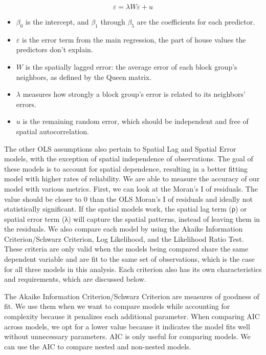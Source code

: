 \documentclass[
  12pt,
]{article}
\providecommand{\tightlist}{%
  \setlength{\itemsep}{0pt}\setlength{\parskip}{0pt}}
\begin{document}
\[ \varepsilon = \lambda W \varepsilon + u \]

\begin{itemize}
\tightlist
\item
  \(\beta_0\) is the intercept, and \(\beta_1\) through \(\beta_5\) are
  the coefficients for each predictor.
\item
  \(\varepsilon\) is the error term from the main regression, the part
  of house values the predictors don't explain.
\item
  \(W\) is the spatially lagged error: the average error of each block
  group's neighbors, as defined by the Queen matrix.
\item
  \(\lambda\) measures how strongly a block group's error is related to
  its neighbors' errors.
\item
  \(u\) is the remaining random error, which should be independent and
  free of spatial autocorrelation.
\end{itemize}

The other OLS assumptions also pertain to Spatial Lag and Spatial Error
models, with the exception of spatial independence of observations. The
goal of these models is to account for spatial dependence, resulting in
a better fitting model with higher rates of reliability. We are able to
measure the accuracy of our model with various metrics. First, we can
look at the Moran's I of residuals. The value should be closer to 0 than
the OLS Moran's I of residuals and ideally not statistically
significant. If the spatial models work, the spatial lag term (ρ) or
spatial error term (λ) will capture the spatial patterns, instead of
leaving them in the residuals. We also compare each model by using the
Akaike Information Criterion/Schwarz Criterion, Log Likelihood, and the
Likelihood Ratio Test. These criteria are only valid when the models
being compared share the same dependent variable and are fit to the same
set of observations, which is the case for all three models in this
analysis. Each criterion also has its own characteristics and
requirements, which are discussed below.

The Akaike Information Criterion/Schwarz Criterion are measures of
goodness of fit. We use them when we want to compare models while
accounting for complexity because it penalizes each additional
parameter. When comparing AIC across models, we opt for a lower value
because it indicates the model fits well without unnecessary parameters.
AIC is only useful for comparing models. We can use the AIC to compare
nested and non-nested models.
\end{document}

